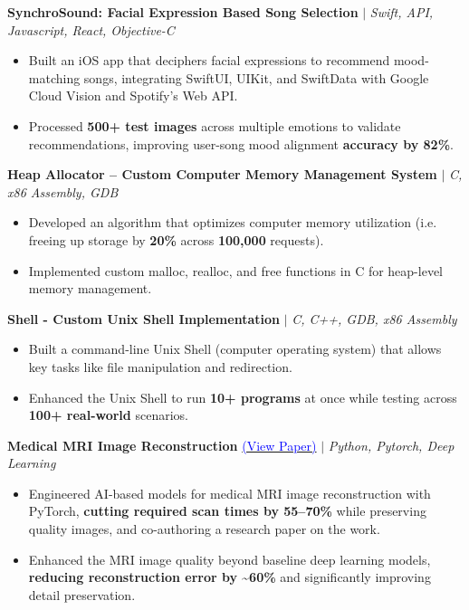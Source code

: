 \documentclass[10pt, letterpaper]{article}
\begin{document}
\smallskip

\textbf{SynchroSound: Facial Expression Based Song Selection} $|$ \textit{Swift, API, Javascript, React, Objective-C}
\begin{itemize}[leftmargin=1.5em, topsep=2pt, itemsep=1pt, parsep=0pt]
  \item Built an iOS app that deciphers facial expressions to recommend mood-matching songs, integrating SwiftUI,
  UIKit, and SwiftData with Google Cloud Vision and Spotify's Web API.
  \item Processed \textbf{500+ test images} across multiple emotions to validate recommendations, improving user-song mood
  alignment \textbf{accuracy by 82\%}.
\end{itemize}

\smallskip

\textbf{Heap Allocator -- Custom Computer Memory Management System} $|$ \textit{C, x86 Assembly, GDB}
\begin{itemize}[leftmargin=1.5em, topsep=2pt, itemsep=1pt, parsep=0pt]
  \item Developed an algorithm that optimizes computer memory utilization (i.e. freeing up storage by \textbf{20\%} across
  \textbf{100,000} requests).
  \item Implemented custom malloc, realloc, and free functions in C for heap-level memory management.
\end{itemize}

\smallskip

\textbf{Shell - Custom Unix Shell Implementation} $|$ \textit{C, C++, GDB, x86 Assembly}
\begin{itemize}[leftmargin=1.5em, topsep=2pt, itemsep=1pt, parsep=0pt]
  \item Built a command-line Unix Shell (computer operating system) that allows key tasks like file manipulation and
  redirection.
  \item Enhanced the Unix Shell to run \textbf{10+ programs} at once while testing across \textbf{100+ real-world} scenarios.
\end{itemize}

\smallskip

\textbf{Medical MRI Image Reconstruction}
\href{https://feolukolawole.com/Accelerated_MRI_Reconstruction.pdf}{{\textcolor{blue}{(View Paper)}}}
$|$ \textit{Python, Pytorch, Deep Learning}
\begin{itemize}[leftmargin=1.5em, topsep=2pt, itemsep=1pt, parsep=0pt]
  \item Engineered AI-based models for medical MRI image reconstruction with PyTorch, \textbf{cutting required scan
  times by 55--70\%} while preserving quality images, and co-authoring a research paper on the work.
  \item Enhanced the MRI image quality beyond baseline deep learning models, \textbf{reducing reconstruction error by
  \textasciitilde60\%} and significantly improving detail preservation.
\end{itemize}
\end{document}
